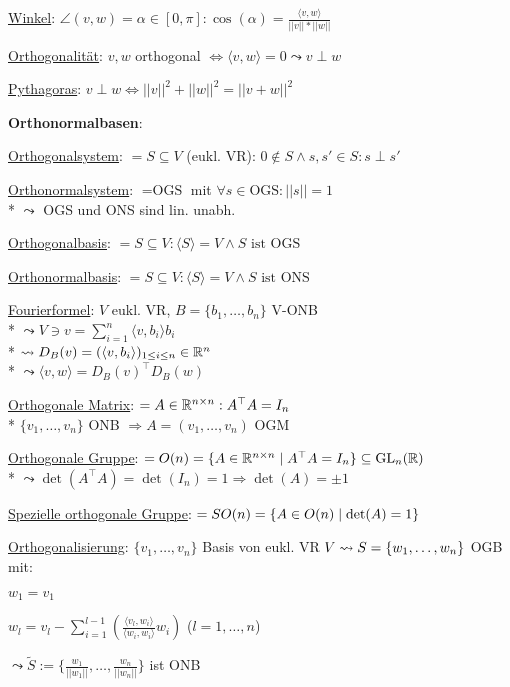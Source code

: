 \begin{items}
	\item \underline{Winkel}: \( \angle(v,w) = \alpha \in [0,\pi]: \cos(\alpha) = \tfrac{\langle v,w \rangle}{||v||*||w||} \)
	\item \underline{Orthogonalität}: \( v,w \) orthogonal \( \Leftrightarrow \langle v,w \rangle = 0 \leadsto v \perp w \)
	\item \underline{Pythagoras}: \( v \perp w \Leftrightarrow ||v||^2 + ||w||^2 = ||v+w||^2 \)
\end{items}

\textbf{Orthonormalbasen}:
\begin{items}
	\item \underline{Orthogonalsystem}: \( = S \subseteq V \) (eukl. VR): \( 0 \not \in S \wedge s, s' \in S: s \perp s' \)
	\item \underline{Orthonormalsystem}: \( = \text{OGS} \) mit \( \forall s \in \text{OGS}: ||s|| = 1 \)
		\\*
		\( \leadsto \) OGS und ONS sind lin. unabh.
	\item \underline{Orthogonalbasis}: \( = S \subseteq V: \langle S \rangle = V \wedge S \text{ ist OGS} \)
	\item \underline{Orthonormalbasis}: \( = S \subseteq V: \langle S \rangle = V \wedge S \text{ ist ONS} \)
	\item \underline{Fourierformel}: \( V \) eukl. VR, \( B = \{ b_1, \dots, b_n \} \) V-ONB
		\\*
		\( \leadsto V \ni v = \sum_{i=1}^n \langle v,b_i \rangle b_i \)
		\\*
		\( \leadsto D_B(v) = (\langle v, b_i \rangle)_{1 \leq i \leq n} \in \mathbb{R}^n \)
		\\*
		\( \leadsto \langle v,w \rangle = D_B(v)^\top D_B(w) \)
	\item \underline{Orthogonale Matrix}: \( = A \in \mathbb{R}^{n \times n}: A^\top A = I_n \)
		\\*
		\( \{ v_1, \dots, v_n \} \) ONB \( \Rightarrow A = (v_1, \dots, v_n) \) OGM
	\item \underline{Orthogonale Gruppe}: \( = O(n) \\* = \{ A \in \mathbb{R}^{n \times n} \mid A^\top A = I_n \} \subseteq \text{GL}_n(\mathbb{R}) \)
		\\* \( \leadsto \det(A^\top A) = \det(I_n) = 1 \Rightarrow \det(A) = \pm 1 \)
	\item \underline{Spezielle orthogonale Gruppe}: \( = SO(n) \\* =\{ A \in O(n) \mid \det(A) = 1 \} \)

	\item \underline{Orthogonalisierung}: \( \{ v_1, \dots, v_n \} \) Basis von eukl. VR \( V \\* \leadsto S = \{ w_1, \dots, w_n \} \) OGB mit:
		\begin{enumeration}
			\item \( w_1 = v_1 \)
			\item \( w_l = v_l - \sum_{i=1}^{l-1}\left( \tfrac{\langle v_l, w_i \rangle}{\langle w_i, w_i \rangle}w_i \right) \) (\( l = 1, \dots, n \))
		\end{enumeration}
		\( \leadsto \widetilde{S} := \{ \tfrac{w_1}{||w_1||}, \dots, \tfrac{w_n}{||w_n||} \} \) ist ONB


\end{items}
